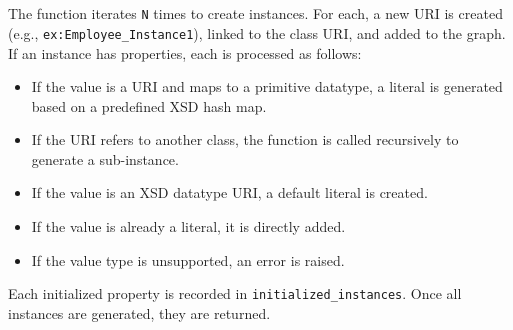 \\
\\
The function iterates \texttt{N} times to create instances. For each, a new URI is created (e.g., \texttt{ex:Employee\_Instance1}), linked to the class URI, and added to the graph. If an instance has properties, each is processed as follows:
\begin{itemize}
    \item If the value is a URI and maps to a primitive datatype, a literal is generated based on a predefined XSD hash map.
    \item If the URI refers to another class, the function is called recursively to generate a sub-instance.
    \item If the value is an XSD datatype URI, a default literal is created.
    \item If the value is already a literal, it is directly added.
    \item If the value type is unsupported, an error is raised.
\end{itemize}
Each initialized property is recorded in \texttt{initialized\_instances}. Once all instances are generated, they are returned.

